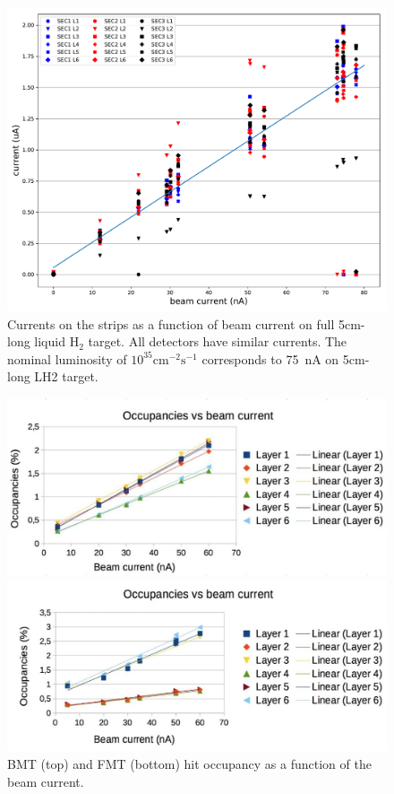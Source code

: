\begin{figure}[htb]
 \includegraphics[width=1.0\columnwidth,keepaspectratio]{images/BMT_IvsLumi}
 \caption{Currents on the strips as a function of beam current on full 5cm-long liquid H$_2$ target. All detectors have similar currents. The nominal luminosity of $10^{35}\text{cm}^{-2}\text{s}^{-1}$ corresponds to 75~nA on 5cm-long LH2 target.}
 \label{fig:mm-fig14}
\end{figure}



\begin{figure}[htb]
 \includegraphics[width=1.0\columnwidth,keepaspectratio]{images/BMT_occ_beam.jpg}
 
 \includegraphics[width=1.0\columnwidth,keepaspectratio]{images/FMT_occ_beam.jpg}
 \caption{BMT (top) and FMT (bottom) hit occupancy as a function of the beam current.}
 \label{fig:mm-fig16}
\end{figure}


